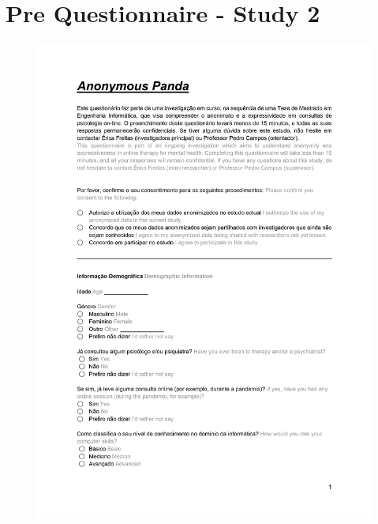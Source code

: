 \clearpage
\section{Pre Questionnaire - Study 2}
\label{appendix:pre2}
\begin{figure}[h!]
\centering
\includegraphics[width=\textwidth]{figures/02_01.jpg}
\end{figure}
